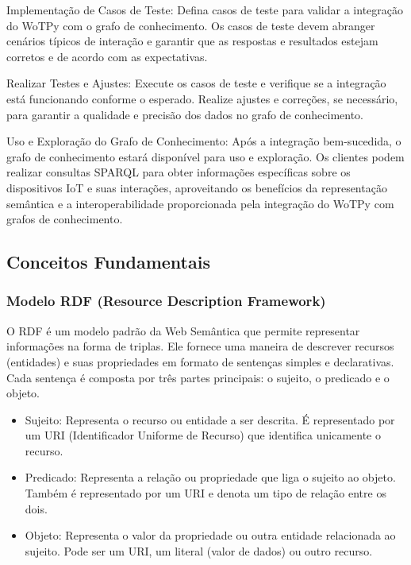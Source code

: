 Implementação de Casos de Teste:
Defina casos de teste para validar a integração do WoTPy com o grafo de conhecimento. Os casos de teste devem abranger cenários típicos de interação e garantir que as respostas e resultados estejam corretos e de acordo com as expectativas.

Realizar Testes e Ajustes:
Execute os casos de teste e verifique se a integração está funcionando conforme o esperado. Realize ajustes e correções, se necessário, para garantir a qualidade e precisão dos dados no grafo de conhecimento.

Uso e Exploração do Grafo de Conhecimento:
Após a integração bem-sucedida, o grafo de conhecimento estará disponível para uso e exploração. Os clientes podem realizar consultas SPARQL para obter informações específicas sobre os dispositivos IoT e suas interações, aproveitando os benefícios da representação semântica e a interoperabilidade proporcionada pela integração do WoTPy com grafos de conhecimento.

\subsection{Conceitos Fundamentais}

\subsubsection{Modelo RDF (Resource Description Framework)}

O RDF é um modelo padrão da Web Semântica que permite representar informações na forma de triplas. Ele fornece uma maneira de descrever recursos (entidades) e suas propriedades em formato de sentenças simples e declarativas. Cada sentença é composta por três partes principais: o sujeito, o predicado e o objeto.
\begin{itemize}
    \item Sujeito: Representa o recurso ou entidade a ser descrita. É representado por um URI (Identificador Uniforme de Recurso) que identifica unicamente o recurso.
    \item Predicado: Representa a relação ou propriedade que liga o sujeito ao objeto. Também é representado por um URI e denota um tipo de relação entre os dois.
    \item Objeto: Representa o valor da propriedade ou outra entidade relacionada ao sujeito. Pode ser um URI, um literal (valor de dados) ou outro recurso.
\end{itemize}

